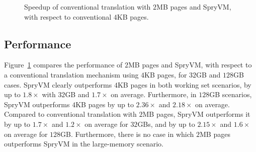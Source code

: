 \begin{figure}[t]
	\centering

	\caption{Speedup of conventional translation with $2$MB pages and SpryVM, with respect to conventional $4$KB pages.
		\label{fig:perf}}
\end{figure}

\subsection{Performance}

Figure~\ref{fig:perf} compares the performance of $2$MB pages and SpryVM, with respect to a conventional translation mechanism using $4$KB pages, for $32$GB and $128$GB cases. SpryVM clearly outperforms $4$KB pages in both working set scenarios, by up to $1.8\times$ with $32$GB and $1.7\times$ on average. Furthermore, in $128$GB scenarios, SpryVM outperforms $4$KB pages by up to $2.36\times$ and $2.18\times$ on average. Compared to conventional translation with $2$MB pages, SpryVM outperforms it by up to $1.7\times$ and $1.2\times$ on average for $32$GBs, and by up to $2.15\times$ and $1.6\times$ on average for $128$GB. Furthermore, there is no case in which $2$MB pages outperforms SpryVM in the large-memory scenario.

